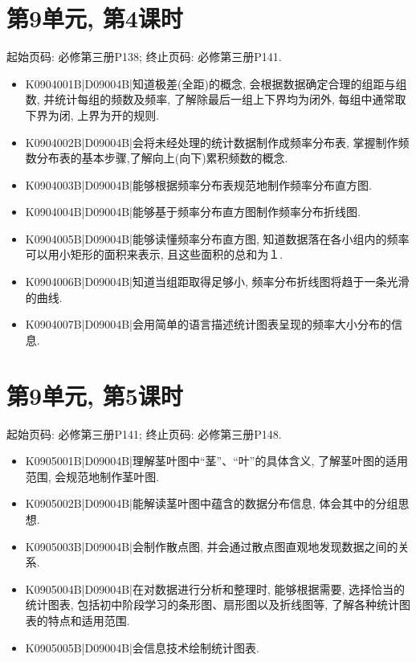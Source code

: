 \section*{第9单元, 第4课时}
起始页码: 必修第三册P138; 终止页码: 必修第三册P141.
\begin{itemize}
\item K0904001B|D09004B|知道极差(全距)的概念, 会根据数据确定合理的组距与组数, 并统计每组的频数及频率, 了解除最后一组上下界均为闭外, 每组中通常取下界为闭, 上界为开的规则.
\item K0904002B|D09004B|会将未经处理的统计数据制作成频率分布表, 掌握制作频数分布表的基本步骤,了解向上(向下)累积频数的概念.
\item K0904003B|D09004B|能够根据频率分布表规范地制作频率分布直方图.
\item K0904004B|D09004B|能够基于频率分布直方图制作频率分布折线图.
\item K0904005B|D09004B|能够读懂频率分布直方图, 知道数据落在各小组内的频率可以用小矩形的面积来表示, 且这些面积的总和为１.
\item K0904006B|D09004B|知道当组距取得足够小, 频率分布折线图将趋于一条光滑的曲线.
\item K0904007B|D09004B|会用简单的语言描述统计图表呈现的频率大小分布的信息.
\end{itemize}

\section*{第9单元, 第5课时}
起始页码: 必修第三册P141; 终止页码: 必修第三册P148.
\begin{itemize}
\item K0905001B|D09004B|理解茎叶图中``茎''、``叶''的具体含义, 了解茎叶图的适用范围, 会规范地制作茎叶图.
\item K0905002B|D09004B|能解读茎叶图中蕴含的数据分布信息, 体会其中的分组思想.
\item K0905003B|D09004B|会制作散点图, 并会通过散点图直观地发现数据之间的关系.
\item K0905004B|D09004B|在对数据进行分析和整理时, 能够根据需要, 选择恰当的统计图表, 包括初中阶段学习的条形图、扇形图以及折线图等, 了解各种统计图表的特点和适用范围.
\item K0905005B|D09004B|会信息技术绘制统计图表.
\end{itemize}

